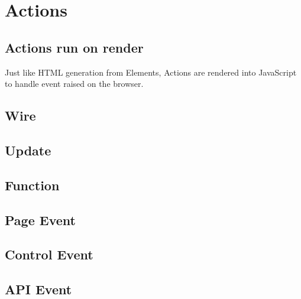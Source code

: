 \section{Actions}

\subsection{Actions run on render}
Just like HTML generation from Elements, Actions are rendered into JavaScript to handle event raised on the browser.

\subsection{Wire}

\subsection{Update}

\subsection{Function}

\subsection{Page Event}

\subsection{Control Event}

\subsection{API Event}

